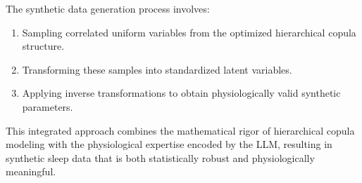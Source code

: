 \documentclass[preprint,12pt]{elsarticle}
\begin{document}
The synthetic data generation process involves:

\begin{enumerate}
\item Sampling correlated uniform variables from the optimized hierarchical copula structure.
\item Transforming these samples into standardized latent variables.
\item Applying inverse transformations to obtain physiologically valid synthetic parameters.
\end{enumerate}

This integrated approach combines the mathematical rigor of hierarchical copula modeling with the physiological expertise encoded by the LLM, resulting in synthetic sleep data that is both statistically robust and physiologically meaningful.
\end{document}
